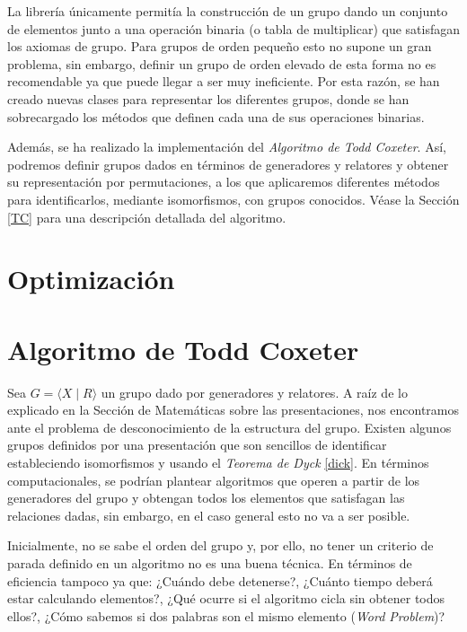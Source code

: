 La librería únicamente permitía la construcción de un grupo dando un conjunto de elementos junto a una operación binaria (o tabla de multiplicar) que satisfagan los axiomas de grupo.  Para grupos de orden pequeño esto no supone un gran problema, sin embargo, definir un grupo de orden elevado de esta forma no es recomendable ya que puede llegar a ser muy ineficiente. Por esta razón, se han creado nuevas clases para representar los diferentes grupos, donde se han sobrecargado los métodos que definen cada una de sus operaciones binarias. %

Además, se ha realizado la implementación del \textit{Algoritmo de Todd Coxeter}. Así, podremos definir grupos dados en términos de generadores y relatores y obtener su representación por permutaciones, a los que aplicaremos diferentes métodos para identificarlos, mediante isomorfismos, con grupos conocidos. Véase la Sección \ref{TC} para una descripción detallada del algoritmo.



\section{Optimización}




\newpage

\section{Algoritmo de Todd Coxeter} \label{tcinfo}
Sea $G = \langle X \mid R \rangle $ un grupo dado por generadores y relatores. A raíz de lo explicado en la Sección de Matemáticas sobre las presentaciones, nos encontramos ante el problema de desconocimiento de la estructura del grupo.  Existen algunos grupos definidos por una presentación que son sencillos de identificar estableciendo isomorfismos y usando el \textit{Teorema de Dyck} \ref{dick}. En términos computacionales, se podrían plantear algoritmos que operen a partir de los generadores del grupo y obtengan todos los elementos que satisfagan las relaciones dadas, sin embargo, en el caso general esto no va a ser posible.

Inicialmente, no se sabe el orden del grupo y, por ello, no tener un criterio de parada definido en un algoritmo no es una buena técnica. En términos de eficiencia tampoco ya que:  ¿Cuándo debe detenerse?, ¿Cuánto tiempo deberá estar calculando elementos?, ¿Qué ocurre si el algoritmo cicla sin obtener todos ellos?, ¿Cómo sabemos si dos palabras son el mismo elemento (\textit{Word Problem})?

